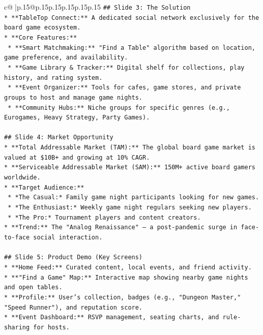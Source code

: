 \documentclass{article}
\begin{document}
{\begin{supertabular}{c@{$\;$}|p{.15\linewidth}@{}p{.15\linewidth}p{.15\linewidth}p{.15\linewidth}p{.15\linewidth}p{.15\linewidth}}
{{{\texttt{\#\# Slide 3: The Solution} \\
\texttt{*   **TableTop Connect:** A dedicated social network exclusively for the board game ecosystem.} \\
\texttt{*   **Core Features:**} \\
\texttt{    *   **Smart Matchmaking:** "Find a Table" algorithm based on location, game preference, and availability.} \\
\texttt{    *   **Game Library \& Tracker:** Digital shelf for collections, play history, and rating system.} \\
\texttt{    *   **Event Organizer:** Tools for cafes, game stores, and private groups to host and manage game nights.} \\
\texttt{    *   **Community Hubs:** Niche groups for specific genres (e.g., Eurogames, Heavy Strategy, Party Games).} \\
\\ 
\texttt{\#\# Slide 4: Market Opportunity} \\
\texttt{*   **Total Addressable Market (TAM):** The global board game market is valued at \$10B+ and growing at 10\% CAGR.} \\
\texttt{*   **Serviceable Addressable Market (SAM):** 150M+ active board gamers worldwide.} \\
\texttt{*   **Target Audience:**} \\
\texttt{    *   *The Casual:* Family game night participants looking for new games.} \\
\texttt{    *   *The Enthusiast:* Weekly game night regulars seeking new players.} \\
\texttt{    *   *The Pro:* Tournament players and content creators.} \\
\texttt{*   **Trend:** The "Analog Renaissance" – a post{-}pandemic surge in face{-}to{-}face social interaction.} \\
\\ 
\texttt{\#\# Slide 5: Product Demo (Key Screens)} \\
\texttt{*   **Home Feed:** Curated content, local events, and friend activity.} \\
\texttt{*   **"Find a Game" Map:** Interactive map showing nearby game nights and open tables.} \\
\texttt{*   **Profile:** User's collection, badges (e.g., "Dungeon Master," "Speed Runner"), and reputation score.} \\
\texttt{*   **Event Dashboard:** RSVP management, seating charts, and rule{-}sharing for hosts.} \\
}}}
\end{supertabular}}
\end{document}
